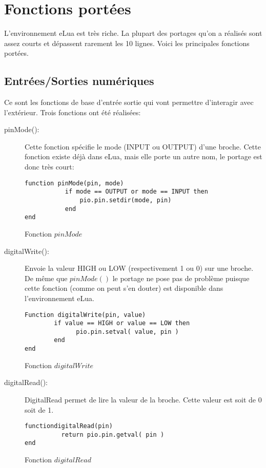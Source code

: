 \chapter[Fonctions portées]{Fonctions portées}
\label{chap:chap6}


L'environnement eLua est très riche.
La plupart des portages qu’on a réalisés sont assez courts et dépassent rarement les 10 lignes. Voici les principales fonctions portées.

\section{Entrées/Sorties numériques}

Ce sont les fonctions de base d’entrée sortie qui vont permettre d’interagir avec l’extérieur.  Trois fonctions ont été réalisées: 

\begin{description}
 \item[pinMode(): ] Cette fonction spécifie le mode (INPUT ou OUTPUT) d’une broche. 
Cette fonction existe déjà dans eLua, mais elle porte un autre nom, le portage est donc très court:

\begin{table}[h]
\begin{lstlisting}
function pinMode(pin, mode)
           if mode == OUTPUT or mode == INPUT then
               pio.pin.setdir(mode, pin)
           end
end
\end{lstlisting}
\caption{Fonction $pinMode$}
\end{table}

\item[digitalWrite(): ] Envoie la valeur HIGH ou LOW (respectivement 1 ou 0) sur une broche. De même que $pinMode()$ 
le portage ne pose pas de problème puisque cette fonction (comme on peut s’en douter) est disponible dans l’environnement eLua.
\newpage
\begin{table}[h]
\begin{lstlisting}
Function digitalWrite(pin, value)
	    if value == HIGH or value == LOW then
              pio.pin.setval( value, pin )
	    end
end
\end{lstlisting}
\caption{Fonction $digitalWrite$}
\end{table}

\item[digitalRead(): ] DigitalRead permet de lire la valeur de la broche. Cette valeur est soit de 0 soit de 1.
\begin{table}[h]
\begin{lstlisting}
functiondigitalRead(pin)
          return pio.pin.getval( pin )
end
\end{lstlisting}
\caption{Fonction $digitalRead$}
\end{table}


\end{description}

